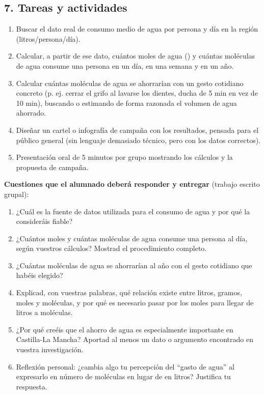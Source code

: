 \documentclass[11pt,a4paper]{article}
\begin{document}
\subsection*{7. Tareas y actividades}
\begin{enumerate}
    \item Buscar el dato real de consumo medio de agua por persona y día en la región (litros/persona/día).
    \item Calcular, a partir de ese dato, cuántos moles de agua () y cuántas moléculas de agua consume una persona en un día, en una semana y en un año.
    \item Calcular cuántas moléculas de agua se ahorrarían con un gesto cotidiano concreto (p. ej. cerrar el grifo al lavarse los dientes, ducha de 5 min en vez de 10 min), buscando o estimando de forma razonada el volumen de agua ahorrado.
    \item Diseñar un cartel o infografía de campaña con los resultados, pensada para el público general (sin lenguaje demasiado técnico, pero con los datos correctos).
    \item Presentación oral de 5 minutos por grupo mostrando los cálculos y la propuesta de campaña.
\end{enumerate}
\textbf{Cuestiones que el alumnado deberá responder y entregar} (trabajo escrito grupal):
\begin{enumerate}
    \item ¿Cuál es la fuente de datos utilizada para el consumo de agua y por qué la consideráis fiable?
    \item ¿Cuántos moles y cuántas moléculas de agua consume una persona al día, según vuestros cálculos? Mostrad el procedimiento completo.
    \item ¿Cuántas moléculas de agua se ahorrarían al año con el gesto cotidiano que habéis elegido?
    \item Explicad, con vuestras palabras, qué relación existe entre litros, gramos, moles y moléculas, y por qué es necesario pasar por los moles para llegar de litros a moléculas.
    \item ¿Por qué creéis que el ahorro de agua es especialmente importante en Castilla-La Mancha? Aportad al menos un dato o argumento encontrado en vuestra investigación.
    \item Reflexión personal: ¿cambia algo tu percepción del ``gasto de agua'' al expresarlo en número de moléculas en lugar de en litros? Justifica tu respuesta.
\end{enumerate}
\end{document}
